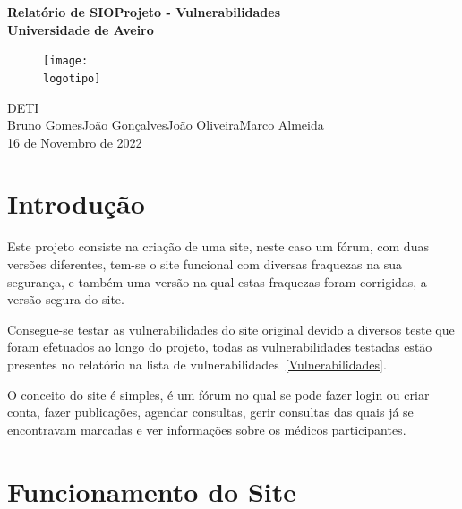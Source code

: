 \documentclass[12pt]{report}
\begin{document}
\def\titulo{\textbf{Relatório de SIO\break \break Projeto - Vulnerabilidades}}
\def\data{16 de Novembro de 2022}
\def\autores{Bruno Gomes\break João Gonçalves\break João Oliveira\break Marco Almeida}
\def\versao{}
\def\departamento{DETI}
\def\empresa{\textbf{Universidade de Aveiro}}
\def\logotipo{img/ua.pdf}


\begin{titlepage}

\begin{center}
%
\vspace*{50mm}
%
{\Huge \titulo}\\
%
\vspace{10mm}
%
{\Large \empresa}\\
%
\begin{figure}[h]
\center
\texttt{[image: \\logotipo]}
\end{figure}
%
\Large \departamento\\
%
\vspace{10mm}
%
{\Large \autores}\\
%
\vspace{10mm}
%
\Large \data\\
%
\end{center}
%
\end{titlepage}

\tableofcontents
\chapter{Introdução}
  \quad Este projeto consiste na criação de uma site, neste caso um fórum, com duas versões diferentes, tem-se o site funcional com diversas fraquezas na sua segurança, e também uma versão na qual estas fraquezas foram corrigidas, a versão segura do site. 
  \par Consegue-se testar as vulnerabilidades do site original devido a diversos teste que foram efetuados ao longo do projeto, todas as vulnerabilidades testadas estão presentes no relatório na lista de vulnerabilidades~\ref{Vulnerabilidades}.
  \par O conceito do site é simples, é um fórum no qual se pode fazer login ou criar conta, fazer publicações, agendar consultas, gerir consultas das quais já se encontravam marcadas e ver informações sobre os médicos participantes.\par

\chapter{Funcionamento do Site}
\end{document}
